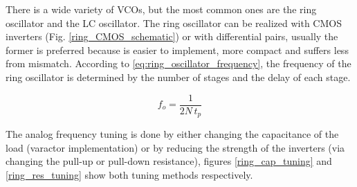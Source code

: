 \begin{minipage}{0.4\textwidth}
    \begin{center}
        \label{fig:VCO_response}
    \end{center}
\end{minipage}

\noindent There is a wide variety of VCOs, but the most common ones are the ring oscillator and the LC oscillator. The ring oscillator can be realized with 
CMOS inverters (Fig. \ref{ring_CMOS_schematic}) or with differential pairs, usually the former is preferred because is easier to 
implement, more compact and suffers less from mismatch. According to \eqref{eq:ring_oscillator_frequency}, the frequency of the ring oscillator is determined by the 
number of stages and the delay of each stage.

\begin{equation}
    f_{o} = \frac{1}{2 N \, t_{p}}
    \label{eq:ring_oscillator_frequency}
\end{equation}

\noindent The analog frequency tuning is done by either changing the capacitance of the load (varactor implementation) or by reducing the strength of the inverters (via changing the
pull-up or pull-down resistance), figures \ref{ring_cap_tuning} and \ref{ring_res_tuning} show both tuning methods respectively.

